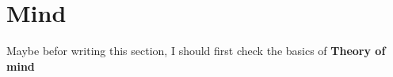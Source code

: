 \chapter{Mind}
Maybe befor writing this section, I should first check the basics of \textbf{Theory of mind}